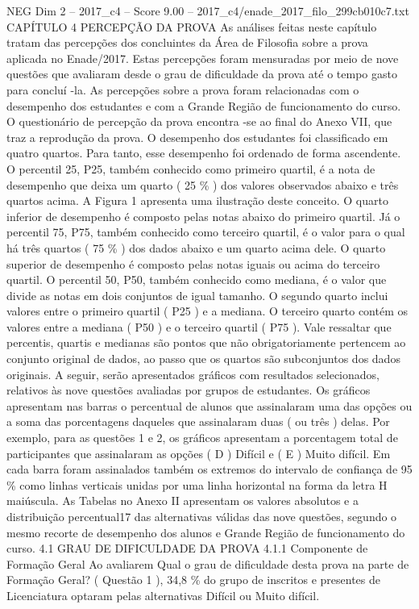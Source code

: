 \begin{textsample}{NEG Dim 2 – 2017\_c4 – Score 9.00 – 2017\_c4/enade\_2017\_filo\_299cb010c7.txt}  \label{ex:f2_neg_338}
CAPÍTULO 4 PERCEPÇÃO DA PROVA As análises feitas neste capítulo tratam das percepções dos concluintes da Área de Filosofia sobre a prova aplicada no Enade/2017.
Estas percepções foram mensuradas por meio de nove questões que avaliaram desde o grau de dificuldade da prova até o tempo gasto para concluí -la.
As percepções sobre a prova foram relacionadas com o desempenho dos estudantes e com a Grande Região de funcionamento do curso.
O questionário de percepção da prova encontra -se ao final do Anexo VII, que traz a reprodução da prova.
O desempenho dos estudantes foi classificado em quatro quartos.
Para tanto, esse desempenho foi ordenado de forma ascendente.
O percentil 25, P25, também conhecido como primeiro quartil, é a nota de desempenho que deixa um quarto ( 25 \% ) dos valores observados abaixo e três quartos acima.
A Figura 1 apresenta uma ilustração deste conceito.
O quarto inferior de desempenho é composto pelas notas abaixo do primeiro quartil.
Já o percentil 75, P75, também conhecido como terceiro quartil, é o valor para o qual há três quartos ( 75 \% ) dos dados abaixo e um quarto acima dele.
O quarto superior de desempenho é composto pelas notas iguais ou acima do terceiro quartil.
O percentil 50, P50, também conhecido como mediana, é o valor que divide as notas em dois conjuntos de igual tamanho.
O segundo quarto inclui valores entre o primeiro quartil ( P25 ) e a mediana.
O terceiro quarto contém os valores entre a mediana ( P50 ) e o terceiro quartil ( P75 ).
Vale ressaltar que percentis, quartis e medianas são pontos que não obrigatoriamente pertencem ao conjunto original de dados, ao passo que os quartos são subconjuntos dos dados originais.
A seguir, serão apresentados gráficos com resultados selecionados, relativos às nove questões avaliadas por grupos de estudantes.
Os gráficos apresentam nas barras o percentual de alunos que assinalaram uma das opções ou a soma das porcentagens daqueles que assinalaram duas ( ou três ) delas.
Por exemplo, para as questões 1 e 2, os gráficos apresentam a porcentagem total de participantes que assinalaram as opções ( D ) Difícil e ( E ) Muito difícil.
Em cada barra foram assinalados também os extremos do intervalo de confiança de 95 \% como linhas verticais unidas por uma linha horizontal na forma da letra H maiúscula.
As Tabelas no Anexo II apresentam os valores absolutos e a distribuição percentual17 das alternativas válidas das nove questões, segundo o mesmo recorte de desempenho dos alunos e Grande Região de funcionamento do curso. 4.1 GRAU DE DIFICULDADE DA PROVA 4.1.1 Componente de Formação Geral Ao avaliarem Qual o grau de dificuldade desta prova na parte de Formação Geral? ( Questão 1 ), 34,8 \% do grupo de inscritos e presentes de Licenciatura optaram pelas alternativas Difícil ou Muito difícil.

\end{textsample}
